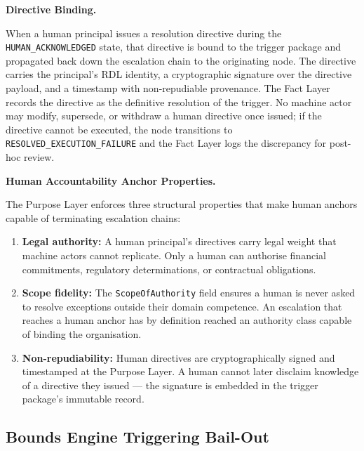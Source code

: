 \bigskip

\noindent\textbf{Directive Binding.}

When a human principal issues a resolution directive during the
\texttt{HUMAN\_ACKNOWLEDGED} state, that directive is bound to the trigger package and
propagated back down the escalation chain to the originating node. The directive carries
the principal's RDL identity, a cryptographic signature over the directive payload, and
a timestamp with non-repudiable provenance. The Fact Layer records the directive as the
definitive resolution of the trigger. No machine actor may modify, supersede, or withdraw
a human directive once issued; if the directive cannot be executed, the node transitions
to \texttt{RESOLVED\_EXECUTION\_FAILURE} and the Fact Layer logs the discrepancy for
post-hoc review.

\bigskip

\noindent\textbf{Human Accountability Anchor Properties.}

The Purpose Layer enforces three structural properties that make human anchors
capable of terminating escalation chains:

\begin{enumerate}
\item \textbf{Legal authority:} A human principal's directives carry legal weight that
  machine actors cannot replicate. Only a human can authorise financial commitments,
  regulatory determinations, or contractual obligations.

\item \textbf{Scope fidelity:} The \texttt{ScopeOfAuthority} field ensures a human is
  never asked to resolve exceptions outside their domain competence. An escalation that
  reaches a human anchor has by definition reached an authority class capable of binding
  the organisation.

\item \textbf{Non-repudiability:} Human directives are cryptographically signed and
  timestamped at the Purpose Layer. A human cannot later disclaim knowledge of a
  directive they issued — the signature is embedded in the trigger package's immutable
  record.
\end{enumerate}


\subsection{Bounds Engine Triggering Bail-Out}
\label{sec:bounds-trigger}

